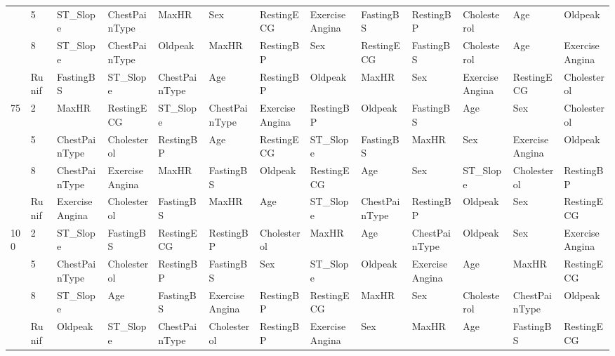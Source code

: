 \begin{table}[htbp]
\begin{tabular}{lllllllllllll}
 & 5 & ST_Slope & ChestPainType & MaxHR & Sex & RestingECG & ExerciseAngina & FastingBS & RestingBP & Cholesterol & Age & Oldpeak \\
 & 8 & ST_Slope & ChestPainType & Oldpeak & MaxHR & RestingBP & Sex & RestingECG & FastingBS & Cholesterol & Age & ExerciseAngina \\
 & Runif & FastingBS & ST_Slope & ChestPainType & Age & RestingBP & Oldpeak & MaxHR & Sex & ExerciseAngina & RestingECG & Cholesterol \\
\multirow[c]{4}{*}{75} & 2 & MaxHR & RestingECG & ST_Slope & ChestPainType & ExerciseAngina & RestingBP & Oldpeak & FastingBS & Age & Sex & Cholesterol \\
 & 5 & ChestPainType & Cholesterol & RestingBP & Age & RestingECG & ST_Slope & FastingBS & MaxHR & Sex & ExerciseAngina & Oldpeak \\
 & 8 & ChestPainType & ExerciseAngina & MaxHR & FastingBS & Oldpeak & RestingECG & Age & Sex & ST_Slope & Cholesterol & RestingBP \\
 & Runif & ExerciseAngina & Cholesterol & FastingBS & MaxHR & Age & ST_Slope & ChestPainType & RestingBP & Oldpeak & Sex & RestingECG \\
\multirow[c]{4}{*}{100} & 2 & ST_Slope & FastingBS & RestingECG & RestingBP & Cholesterol & MaxHR & Age & ChestPainType & Oldpeak & Sex & ExerciseAngina \\
 & 5 & ChestPainType & Cholesterol & RestingBP & FastingBS & Sex & ST_Slope & Oldpeak & ExerciseAngina & Age & MaxHR & RestingECG \\
 & 8 & ST_Slope & Age & FastingBS & ExerciseAngina & RestingBP & RestingECG & MaxHR & Sex & Cholesterol & ChestPainType & Oldpeak \\
 & Runif & Oldpeak & ST_Slope & ChestPainType & Cholesterol & RestingBP & ExerciseAngina & Sex & MaxHR & Age & FastingBS & RestingECG \\
\bottomrule
\end{tabular}
\end{table}

